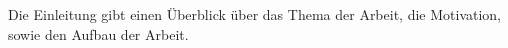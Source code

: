 Die Einleitung gibt einen Überblick über das Thema der Arbeit, die Motivation, sowie den Aufbau der Arbeit.
